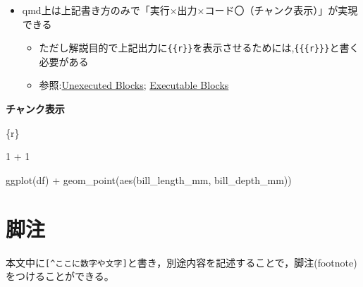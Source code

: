 \documentclass[
  b5paper,
  xelatex, ja=standard]{bxjsbook}
\newenvironment{Shaded}{\begin{snugshade}}{\end{snugshade}}
\newcommand{\InformationTok}[1]{\textcolor[rgb]{0.37,0.37,0.37}{#1}}
\providecommand{\tightlist}{%
  \setlength{\itemsep}{0pt}\setlength{\parskip}{0pt}}\usepackage{longtable,booktabs,array}
\begin{document}
\begin{itemize}
\tightlist
\item
  qmd上は上記書き方のみで「実行×\textbar 出力×\textbar コード〇（チャンク表示）」が実現できる

  \begin{itemize}
  \tightlist
  \item
    ただし解説目的で上記出力に\texttt{\{\{r\}\}}を表示させるためには,\texttt{\{\{\{r\}\}\}}と書く必要がある
  \item
    参照:\href{https://quarto.org/docs/computations/execution-options.html\#unexecuted-blocks}{Unexecuted
    Blocks};
    \href{https://quarto.org/docs/output-formats/html-code.html\#executable-blocks}{Executable
    Blocks}
  \end{itemize}
\end{itemize}

\textbf{チャンク表示}

\begin{Shaded}
\begin{Highlighting}[]
\InformationTok{\textasciigrave{}\textasciigrave{}\textasciigrave{}\{r\}}


\InformationTok{1 + 1}


\InformationTok{ggplot(df) +}
\InformationTok{  geom\_point(aes(bill\_length\_mm, bill\_depth\_mm))}
\InformationTok{\textasciigrave{}\textasciigrave{}\textasciigrave{}}
\end{Highlighting}
\end{Shaded}

\section{脚注}\label{ux811aux6ce8}

本文中に\texttt{{[}\^{}ここに数字や文字{]}}と書き，別途内容を記述することで，脚注(footnote)をつけることができる。
\end{document}
